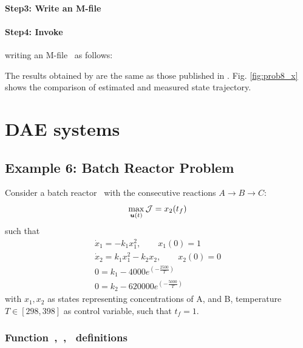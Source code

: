 {\small }

\paragraph{Step3: Write an M-file~}

{\small }

\paragraph{Step4: Invoke~} writing an
M-file~ as follows:

{\small }

The results obtained by  are the same as those published
in \cite{fik02}. Fig. \ref{fig:prob8_x} shows the comparison of
estimated and measured state trajectory. 

\section{DAE systems}
\label{sec:daes}

\subsection{Example 6: Batch Reactor Problem}
\label{sec:brpdae}

Consider a batch reactor~\citep{raj01,dad95} with the 
consecutive reactions $A \rightarrow B\rightarrow C$:
\begin{equation}
\max_{\ve{u}(t)} \mf{J} = x_{2}(t_{f}) \label{eq:batch_dae}
\end{equation}
such that
\begin{gather}
\dot{x}_{1} = -k_{1}x_{1}^{2}, \qquad x_1(0) = 1 \\
\dot{x}_{2} = k_{1}x_{1}^{2} - k_{2}x_{2}, \qquad x_2(0) = 0 \\
0 = k_{1} - 4000e^{(-\frac{2500}{T})} \\
0 = k_{2} - 620000e^{(-\frac{5000}{T})} 
\end{gather} with $x_{1}, x_{2}$ as states representing concentrations
of A, and B, temperature $T \in [298,398]$ as control variable, such
that $t_{f} = 1$.

\subsubsection{Function~,~,~  definitions}
\label{sec:example-fundef}

